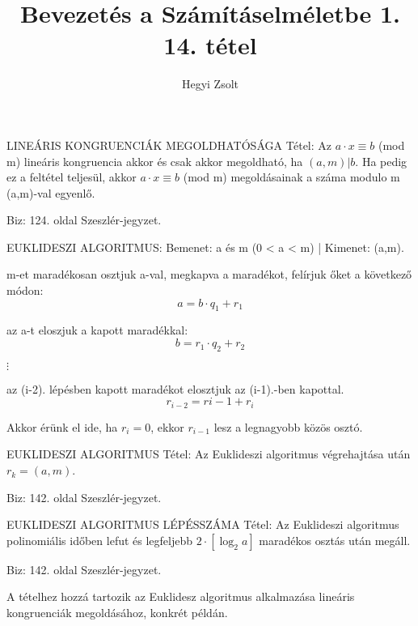 \documentclass[]{article}
\title{Bevezetés a Számításelméletbe 1.\\{\large 14. tétel}}
\author{Hegyi Zsolt}
\begin{document}
\maketitle{}
\begin{framed}
LINEÁRIS KONGRUENCIÁK MEGOLDHATÓSÁGA Tétel: Az $a \cdot x \equiv b$ (mod m) lineáris kongruencia akkor és csak akkor megoldható, ha $(a,m)|b$. Ha pedig ez a feltétel teljesül, akkor  $a \cdot x \equiv b$ (mod m) megoldásainak a száma modulo m (a,m)-val egyenlő.
\end{framed}
\begin{leftbar}
Biz: 124. oldal Szeszlér-jegyzet.
\end{leftbar}
\begin{framed}
EUKLIDESZI ALGORITMUS: Bemenet: a és m (0 < a < m) | Kimenet: (a,m).
\begin{description}
\item[1. lépés:]m-et maradékosan osztjuk a-val, megkapva a maradékot, felírjuk őket a következő módon:
$$a = b\cdot q_1 + r_1$$
\item[2. lépés:]az a-t eloszjuk a kapott maradékkal:
$$b = r_1\cdot q_2 + r_2$$
\item $\vdots$
\item[i. lépés:] az (i-2). lépésben kapott maradékot elosztjuk az (i-1).-ben kapottal.
$$r_{i-2} = r{i-1} + r_i$$
\item[Utolsó lépés] Akkor érünk el ide, ha $r_i = 0$, ekkor $r_{i-1}$ lesz a legnagyobb közös osztó.
\end{description}
\end{framed}
\begin{framed}
EUKLIDESZI ALGORITMUS Tétel: Az Euklideszi algoritmus végrehajtása után $r_k = (a,m)$.
\end{framed}
\begin{leftbar}
Biz: 142. oldal Szeszlér-jegyzet.
\end{leftbar}
\begin{framed}
EUKLIDESZI ALGORITMUS LÉPÉSSZÁMA Tétel: Az Euklideszi algoritmus polinomiális időben lefut és legfeljebb $2 \cdot [\log_2a]$ maradékos osztás után megáll.
\end{framed}
\begin{leftbar}
Biz: 142. oldal Szeszlér-jegyzet.
\end{leftbar}
A tételhez hozzá tartozik az Euklidesz algoritmus alkalmazása lineáris kongruenciák megoldásához, konkrét példán.
\end{document}
